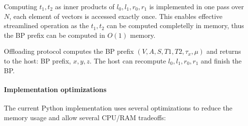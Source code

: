 \documentclass[]{article}
\begin{document}
Computing $t_1, t_2$ as inner products of $l_0, l_1, r_0, r_1$ is implemented in one pass over $N$, each element of vectors is accessed exactly once. This enables effective streamlined operation as the $t_1, t_2$ can be computed completelly in memory, thus the BP prefix can be computed in $O(1)$ memory.

Offloading protocol computes the BP prefix $(V, A, S, T1, T2, \tau_x, \mu)$ and returns to the host: BP prefix, $x, y, z$. The host can recompute $l_0, l_1, r_0, r_1$ and finish the BP.

\paragraph{Implementation optimizations}
The current Python implementation uses several optimizations to reduce the memory usage and allow several CPU/RAM tradeoffs:
\end{document}
